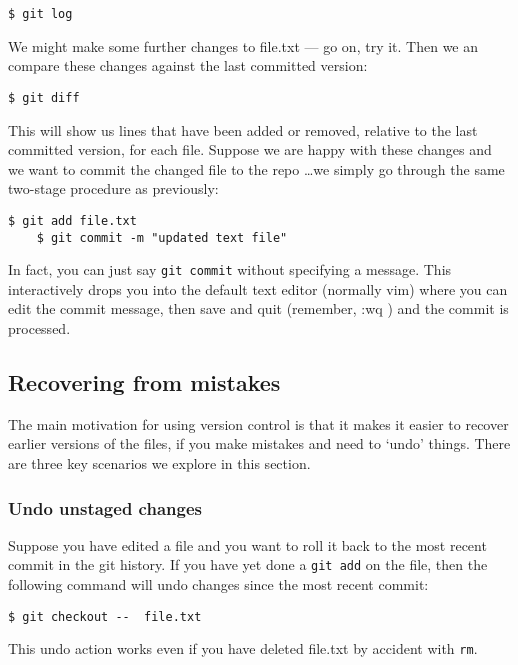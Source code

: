 \documentclass{article}
\begin{document}
\begin{lstlisting}[style=BashInputStyle]
    $ git log
\end{lstlisting}

We might make some further changes to file.txt --- go on, try it. Then we an
compare these changes against the last committed version:

\begin{lstlisting}[style=BashInputStyle]
    $ git diff
\end{lstlisting}

This will show us lines that have been added or removed, relative to the last
committed version, for each file. Suppose we are happy with these changes
and we want to commit the changed file to the repo \ldots we simply go
through the same two-stage procedure as previously:

\begin{lstlisting}[style=BashInputStyle]
    $ git add file.txt
    $ git commit -m "updated text file"
\end{lstlisting}

In fact, you can just say \texttt{git commit} without specifying a message.
This interactively drops you into the default text editor (normally vim)
where you can edit the commit message, then save and quit
(remember, \keys{\esc} :wq \keys{\enter}) and the commit is processed.

\subsection*{Recovering from mistakes}

The main motivation for using version control is that it makes it easier
to recover earlier versions of the files, if you make mistakes and need to
`undo' things. There are three key scenarios we explore in this section.


\subsubsection*{Undo unstaged changes}

Suppose you have edited a file and you want to roll it back to the most recent
commit in the git history.
If you have yet done a \texttt{git add} on the file, then the following command will undo changes since the most recent commit:
\begin{lstlisting}[style=BashInputStyle]
    $ git checkout --  file.txt
\end{lstlisting}
This undo action works even if you have deleted file.txt by accident with
\texttt{rm}.
\end{document}
